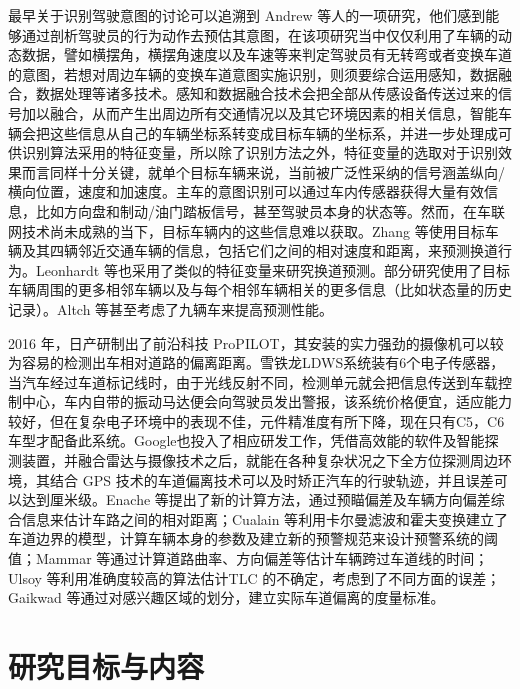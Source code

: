 最早关于识别驾驶意图的讨论可以追溯到 Andrew 等人的一项研究\cite{liu1997realtime}，他们感到能够通过剖析驾驶员的行为动作去预估其意图，在该项研究当中仅仅利用了车辆的动态数据，譬如横摆角，横摆角速度以及车速等来判定驾驶员有无转弯或者变换车道的意图，若想对周边车辆的变换车道意图实施识别，则须要综合运用感知，数据融合，数据处理等诸多技术\cite{zhang2023highway}。感知和数据融合技术会把全部从传感设备传送过来的信号加以融合，从而产生出周边所有交通情况以及其它环境因素的相关信息，智能车辆会把这些信息从自己的车辆坐标系转变成目标车辆的坐标系，并进一步处理成可供识别算法采用的特征变量，所以除了识别方法之外，特征变量的选取对于识别效果而言同样十分关键，就单个目标车辆来说，当前被广泛性采纳的信号涵盖纵向/横向位置，速度和加速度\cite{woo2017lane}。主车的意图识别可以通过车内传感器获得大量有效信息，比如方向盘和制动/油门踏板信号，甚至驾驶员本身的状态等。然而，在车联网技术尚未成熟的当下，目标车辆内的这些信息难以获取。Zhang 等\cite{zhang2018lane}使用目标车辆及其四辆邻近交通车辆的信息，包括它们之间的相对速度和距离，来预测换道行为。Leonhardt 等\cite{leonhardt2017feature}也采用了类似的特征变量来研究换道预测。部分研究使用了目标车辆周围的更多相邻车辆以及与每个相邻车辆相关的更多信息（比如状态量的历史记录）\cite{patel2018predicting}。Altch 等\cite{altche2017lstm}甚至考虑了九辆车来提高预测性能。

2016 年，日产研制出了前沿科技 ProPILOT，其安装的实力强劲的摄像机可以较为容易的检测出车相对道路的偏离距离\cite{zhang2016nissan}。雪铁龙LDWS系统装有6个电子传感器，当汽车经过车道标记线时，由于光线反射不同，检测单元就会把信息传送到车载控制中心，车内自带的振动马达便会向驾驶员发出警报，该系统价格便宜，适应能力较好，但在复杂电子环境中的表现不佳，元件精准度有所下降，现在只有C5，C6车型才配备此系统。Google也投入了相应研发工作，凭借高效能的软件及智能探测装置，并融合雷达与摄像技术之后，就能在各种复杂状况之下全方位探测周边环境\cite{wang2020autonomous}，其结合 GPS 技术的车道偏离技术可以及时矫正汽车的行驶轨迹，并且误差可以达到厘米级。Enache 等\cite{enache2009driver}提出了新的计算方法，通过预瞄偏差及车辆方向偏差综合信息来估计车路之间的相对距离；Cualain 等\cite{cualain2012automotive}利用卡尔曼滤波和霍夫变换建立了车道边界的模型，计算车辆本身的参数及建立新的预警规范来设计预警系统的阈值；Mammar 等\cite{mammar2006time}通过计算道路曲率、方向偏差等估计车辆跨过车道线的时间；Ulsoy 等\cite{chiu1996time}利用准确度较高的算法估计TLC 的不确定，考虑到了不同方面的误差；Gaikwad 等\cite{gaikwad2015lane}通过对感兴趣区域的划分，建立实际车道偏离的度量标准。

\section{研究目标与内容}


